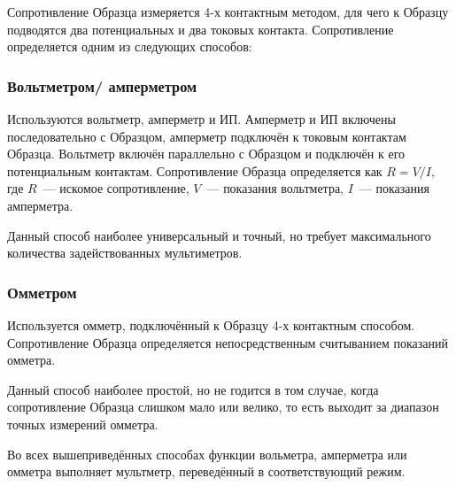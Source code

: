 \label{sec_r_measures}

Сопротивление Образца измеряется 4-х контактным методом, для чего к Образцу подводятся два потенциальных и два токовых контакта. Сопротивление определяется одним из следующих способов:

\subsubsection{Вольтметром/ амперметром}

Используются вольтметр, амперметр и ИП. Амперметр и ИП включены последовательно с Образцом, амперметр подключён к токовым контактам Образца. Вольтметр включён параллельно с Образцом и подключён к его потенциальным контактам. Сопротивление Образца определяется как $R = V/I$, где $R$~--- искомое сопротивление, $V$~--- показания вольтметра, $I$~--- показания амперметра.

Данный способ наиболее универсальный и точный, но требует максимального количества задействованных мультиметров.

\subsubsection{Омметром}
\label{sec_r_measures_ohm}

Используется омметр, подключённый к Образцу 4-х контактным способом. Сопротивление Образца определяется непосредственным считыванием показаний омметра.

Данный способ наиболее простой, но не годится в том случае, когда сопротивление Образца слишком мало или велико, то есть выходит за диапазон точных измерений омметра.

\bigskip 

Во всех вышеприведённых способах функции вольметра, амперметра или омметра выполняет мультметр, переведённый в соответствующий режим.

